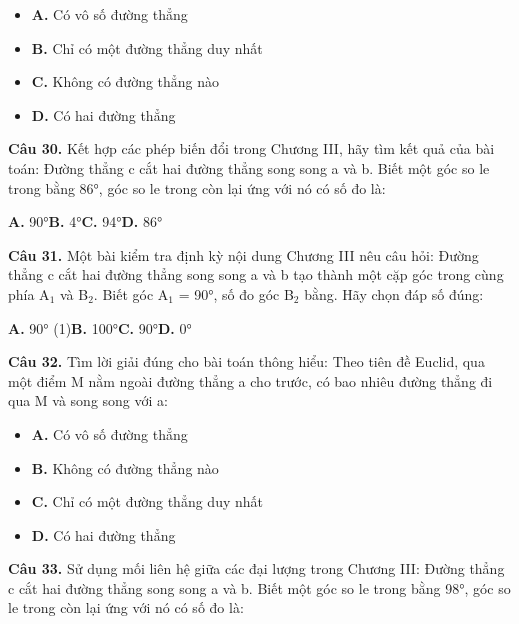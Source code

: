 \documentclass[11pt,a4paper]{article}
\begin{document}
\begin{itemize}\setlength{\itemsep}{1pt}\setlength{\parskip}{0pt}
  \item[] \textbf{A.} Có vô số đường thẳng
  \item[] \textbf{B.} Chỉ có một đường thẳng duy nhất
  \item[] \textbf{C.} Không có đường thẳng nào
  \item[] \textbf{D.} Có hai đường thẳng
\end{itemize}\vspace{2pt}
\textbf{\color{primary} Câu 30.} Kết hợp các phép biến đổi trong Chương III, hãy tìm kết quả của bài toán: Đường thẳng c cắt hai đường thẳng song song a và b. Biết một góc so le trong bằng 86°, góc so le trong còn lại ứng với nó có số đo là:\par
\hspace*{1.5em}\textbf{A.} 90°\quad\quad \textbf{B.} 4°\quad\quad \textbf{C.} 94°\quad\quad \textbf{D.} 86°\par\vspace{2pt}
\textbf{\color{primary} Câu 31.} Một bài kiểm tra định kỳ nội dung Chương III nêu câu hỏi: Đường thẳng c cắt hai đường thẳng song song a và b tạo thành một cặp góc trong cùng phía A$_1$ và B$_2$. Biết góc A$_1$ = 90°, số đo góc B$_2$ bằng. Hãy chọn đáp số đúng:\par
\hspace*{1.5em}\textbf{A.} 90° (1)\quad\quad \textbf{B.} 100°\quad\quad \textbf{C.} 90°\quad\quad \textbf{D.} 0°\par\vspace{2pt}
\textbf{\color{primary} Câu 32.} Tìm lời giải đúng cho bài toán thông hiểu: Theo tiên đề Euclid, qua một điểm M nằm ngoài đường thẳng a cho trước, có bao nhiêu đường thẳng đi qua M và song song với a:\par
\begin{itemize}\setlength{\itemsep}{1pt}\setlength{\parskip}{0pt}
  \item[] \textbf{A.} Có vô số đường thẳng
  \item[] \textbf{B.} Không có đường thẳng nào
  \item[] \textbf{C.} Chỉ có một đường thẳng duy nhất
  \item[] \textbf{D.} Có hai đường thẳng
\end{itemize}\vspace{2pt}
\textbf{\color{primary} Câu 33.} Sử dụng mối liên hệ giữa các đại lượng trong Chương III: Đường thẳng c cắt hai đường thẳng song song a và b. Biết một góc so le trong bằng 98°, góc so le trong còn lại ứng với nó có số đo là:\par
\end{document}
